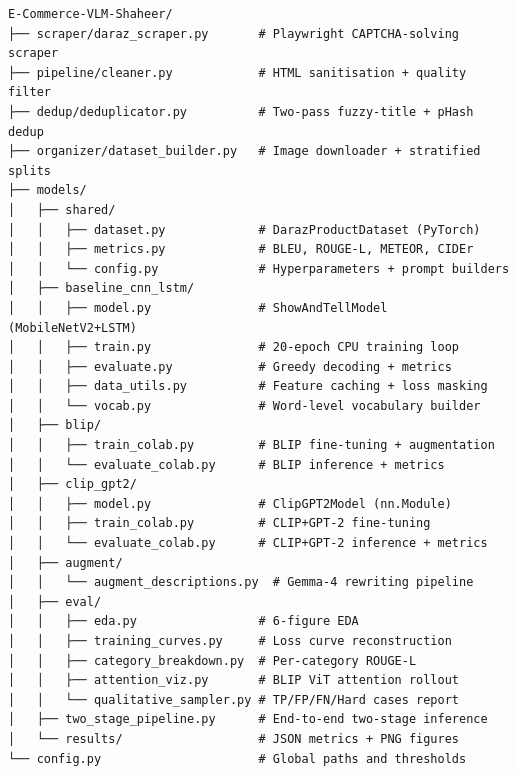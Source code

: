 \documentclass[12pt,a4paper]{article}
\begin{document}
{\small\begin{verbatim}
E-Commerce-VLM-Shaheer/
├── scraper/daraz_scraper.py       # Playwright CAPTCHA-solving scraper
├── pipeline/cleaner.py            # HTML sanitisation + quality filter
├── dedup/deduplicator.py          # Two-pass fuzzy-title + pHash dedup
├── organizer/dataset_builder.py   # Image downloader + stratified splits
├── models/
│   ├── shared/
│   │   ├── dataset.py             # DarazProductDataset (PyTorch)
│   │   ├── metrics.py             # BLEU, ROUGE-L, METEOR, CIDEr
│   │   └── config.py              # Hyperparameters + prompt builders
│   ├── baseline_cnn_lstm/
│   │   ├── model.py               # ShowAndTellModel (MobileNetV2+LSTM)
│   │   ├── train.py               # 20-epoch CPU training loop
│   │   ├── evaluate.py            # Greedy decoding + metrics
│   │   ├── data_utils.py          # Feature caching + loss masking
│   │   └── vocab.py               # Word-level vocabulary builder
│   ├── blip/
│   │   ├── train_colab.py         # BLIP fine-tuning + augmentation
│   │   └── evaluate_colab.py      # BLIP inference + metrics
│   ├── clip_gpt2/
│   │   ├── model.py               # ClipGPT2Model (nn.Module)
│   │   ├── train_colab.py         # CLIP+GPT-2 fine-tuning
│   │   └── evaluate_colab.py      # CLIP+GPT-2 inference + metrics
│   ├── augment/
│   │   └── augment_descriptions.py  # Gemma-4 rewriting pipeline
│   ├── eval/
│   │   ├── eda.py                 # 6-figure EDA
│   │   ├── training_curves.py     # Loss curve reconstruction
│   │   ├── category_breakdown.py  # Per-category ROUGE-L
│   │   ├── attention_viz.py       # BLIP ViT attention rollout
│   │   └── qualitative_sampler.py # TP/FP/FN/Hard cases report
│   ├── two_stage_pipeline.py      # End-to-end two-stage inference
│   └── results/                   # JSON metrics + PNG figures
└── config.py                      # Global paths and thresholds
\end{verbatim}}
\end{document}

